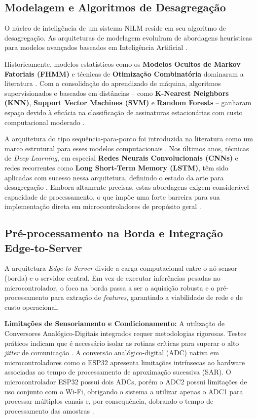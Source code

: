 \documentclass[12pt]{article}
\begin{document}
\subsection{Modelagem e Algoritmos de Desagrega\c{c}\~ao}

O n\'ucleo de intelig\^encia de um sistema NILM reside em seu algoritmo de
desagrega\c{c}\~ao. As arquiteturas de modelagem evolu\'iram de abordagens
heur\'isticas para modelos avan\c{c}ados baseados em Intelig\^encia Artificial
\citep{ref4}.

Historicamente, modelos estat\'isticos como os \textbf{Modelos Ocultos de Markov
Fatoriais (FHMM)} e t\'ecnicas de \textbf{Otimiza\c{c}\~ao Combinat\'oria}
dominaram a literatura \citep{ref2,ref3,ref4}. Com a consolida\c{c}\~ao do aprendizado de
m\'aquina, algoritmos supervisionados e baseados em dist\^ancias -- como
\textbf{K-Nearest Neighbors (KNN)}, \textbf{Support Vector Machines (SVM)} e
\textbf{Random Forests} -- ganharam espa\c{c}o devido \`a efic\'acia na
classifica\c{c}\~ao de assinaturas estacion\'arias com custo computacional moderado
\citep{ref6}.

A arquitetura do tipo sequ\^encia-para-ponto foi introduzida na literatura como um
marco estrutural para esses modelos computacionais \citep{ref5}. Nos \'ultimos anos,
t\'ecnicas de \textit{Deep Learning}, em especial \textbf{Redes Neurais
Convolucionais (CNNs)} e redes recorrentes como \textbf{Long Short-Term Memory
(LSTM)}, t\^em sido aplicadas com sucesso nessa arquitetura, definindo o estado da
arte para desagrega\c{c}\~ao \citep{ref7}. Embora altamente precisas, estas
abordagens exigem consider\'avel capacidade de processamento, o que imp\~oe uma
forte barreira para sua implementa\c{c}\~ao direta em microcontroladores de
prop\'osito geral \citep{ref7}.

\subsection{Pr\'e-processamento na Borda e Integra\c{c}\~ao Edge-to-Server}

A arquitetura \textit{Edge-to-Server} divide a carga computacional entre o n\'o
sensor (borda) e o servidor central. Em vez de executar infer\^encias pesadas no
microcontrolador, o foco na borda passa a ser a aquisi\c{c}\~ao robusta e o
pr\'e-processamento para extra\c{c}\~ao de \textit{features}, garantindo a
viabilidade de rede e de custo operacional.

\textbf{Limita\c{c}\~oes de Sensoriamento e Condicionamento:} A utiliza\c{c}\~ao
de Conversores Anal\'ogico-Digitais integrados requer metodologias rigorosas.
Testes pr\'aticos indicam que \'e necess\'ario isolar as rotinas cr\'iticas para
superar o alto \textit{jitter} de comunica\c{c}\~ao \citep{ref8}. A convers\~ao
anal\'ogico-digital (ADC) nativa em microcontroladores como o ESP32 apresenta
limita\c{c}\~oes intr\'insecas ao hardware associadas ao tempo de processamento de
aproxima\c{c}\~ao sucessiva (SAR). O microcontrolador ESP32 possui dois ADCs, por\'em
o ADC2 possui limita\c{c}\~oes de uso conjunto com o Wi-Fi, obrigando o sistema a
utilizar apenas o ADC1 para processar m\'ultiplos canais e, por consequ\^encia,
dobrando o tempo de processamento das amostras \citep{ref8}.
\end{document}
